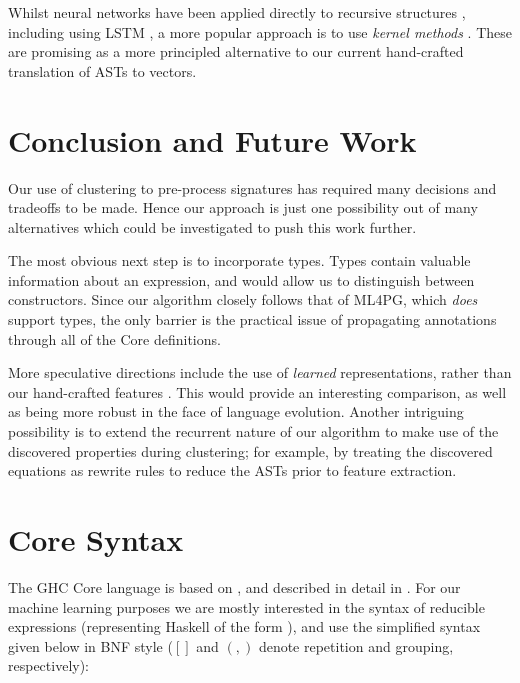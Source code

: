 Whilst neural networks have been applied directly to recursive structures
\cite{goller1996learning}, including using LSTM \cite{zhu2015long}, a more
popular approach is to use \emph{kernel methods}
\cite{bakir2007predicting}. These are promising as a more principled alternative
to our current hand-crafted translation of ASTs to vectors.

\section{Conclusion and Future Work}
\label{sec:conclusion}

Our use of clustering to pre-process \qspec{} signatures has required many
decisions and tradeoffs to be made. Hence our approach is just one possibility
out of many alternatives which could be investigated to push this work further.

The most obvious next step is to incorporate types. Types contain valuable
information about an expression, and would allow us to distinguish between
constructors. Since our algorithm closely follows that of ML4PG, which
\emph{does} support types, the only barrier is the practical issue of
propagating annotations through all of the Core definitions.

More speculative directions include the use of \emph{learned} representations,
rather than our hand-crafted features \cite{bengio2013representation}. This
would provide an interesting comparison, as well as being more robust in the
face of language evolution. Another intriguing possibility is to extend the
recurrent nature of our algorithm to make use of the discovered properties
during clustering; for example, by treating the discovered equations as rewrite
rules to reduce the ASTs prior to feature extraction.

\appendix

\section{Core Syntax}\label{sec:core}

The GHC Core language is based on \fc{}, and described in detail in
\cite[Appendix C]{sulzmann2007system}. For our machine learning purposes we are
mostly interested in the syntax of reducible expressions (representing Haskell
of the form ), and use the simplified syntax given below
in BNF style ($[]$ and $(,)$ denote repetition and grouping, respectively):

